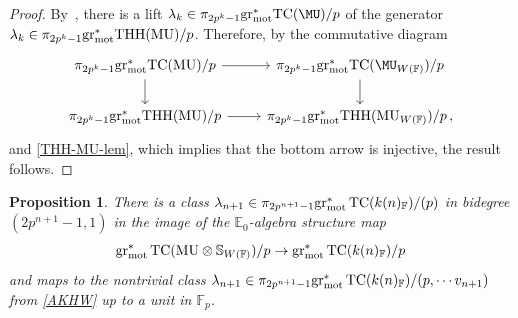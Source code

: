 \documentclass[english,10pt]{amsart}
\newcommand{\field}{\mathbb{F}}
\newtheorem{prop}{Proposition}[section]
\theoremstyle{definition}
\numberwithin{equation}{section}
\DeclareMathOperator{\TC}{TC}
\newcommand{\grmot}{\mathrm{gr}_{\textup{mot}}^*}
\begin{document}
\begin{proof}
By~\cite[Lemma~3.2.5]{angelini2024syntomic}, there is a lift $\lambda_k\in \pi_{2p^k-1}\grmot\mathrm{TC}(\MU)/p$ of the generator $\lambda_k\in \pi_{2p^k-1}\grmot\mathrm{THH}(\mathrm{MU})/p$. Therefore, by the commutative diagram 
\[
\begin{tikzcd}
\pi_{2p^k-1}\grmot\mathrm{TC}(\mathrm{MU})/p\arrow{d} \arrow{r} &  \pi_{2p^k-1}\grmot\mathrm{TC}(\MU_{W(\field)})/p \arrow{d} \\ 
\pi_{2p^k-1}\grmot\mathrm{THH}(\mathrm{MU})/p \arrow{r} & \pi_{2p^k-1}\grmot\mathrm{THH}(\mathrm{MU}_{W(\field)})/p \,,
\end{tikzcd}
\]
and \autoref{THH-MU-lem}, which implies that the bottom arrow is injective, the result follows. 
\end{proof}

\begin{prop}\label{lambdas} 
There is a class 
$\lambda_{n+1}\in \pi_{2p^{n+1}-1}\grmot\TC(k(n)_{\field})/(p)$ in bidegree $(2p^{n+1}-1,1)$ in the image of the $\mathbb{E}_0$-algebra structure map 
\[\grmot\TC(\mathrm{MU}\otimes \mathbb{S}_{W(\field)})/p\to\grmot\TC(k(n)_{\field})/p\] 
and maps to the nontrivial class $\lambda_{n+1}\in \pi_{2p^{n+1}-1}\grmot\TC(k(n)_{\field})/(p,\cdots v_{n+1})$ from \autoref{AKHW} up to a unit in $\mathbb{F}_p$. 
\end{prop}
\end{document}
